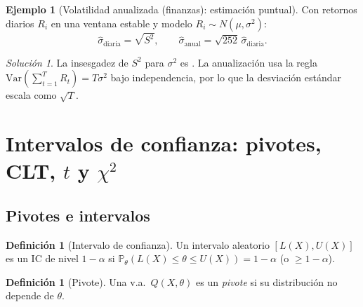 \documentclass[11pt]{article}
\theoremstyle{plain}
\theoremstyle{definition}
\newtheorem{definition}[theorem]{Definición}
\newtheorem{example}[theorem]{Ejemplo}
\theoremstyle{remark}
\theoremstyle{solstyle}
\newtheorem*{solution}{Solución}
\newcommand{\Var}{\mathrm{Var}}
\newcommand{\Pbb}{\mathbb{P}}
\newcommand{\1}{\mathbbm{1}}
\begin{document}
\begin{example}[Volatilidad anualizada (finanzas): estimación puntual]\label{ex:vol-annual}
Con retornos diarios $R_i$ en una ventana estable y modelo $R_i\sim N(\mu,\sigma^2)$:
\[
\widehat\sigma_{\text{diaria}}=\sqrt{S^2},\qquad
\widehat\sigma_{\text{anual}}=\sqrt{252}\,\widehat\sigma_{\text{diaria}}.
\]
\end{example}

\begin{solution}
La insesgadez de $S^2$ para $\sigma^2$ es .
La anualización usa la regla $\Var(\sum_{t=1}^{T}R_t)=T\sigma^2$ bajo independencia,
por lo que la desviación estándar escala como $\sqrt{T}$.
\end{solution}

\begin{center}
\end{center}

\section{Intervalos de confianza: pivotes, CLT, $t$ y $\chi^2$}

\subsection{Pivotes e intervalos}

\begin{definition}[Intervalo de confianza]
Un intervalo aleatorio $[L(X),U(X)]$ es un IC de nivel $1-\alpha$ si
$\Pbb_\theta(L(X)\le \theta\le U(X))=1-\alpha$ (o $\ge 1-\alpha$).
\end{definition}

\begin{definition}[Pivote]
Una v.a.\ $Q(X,\theta)$ es un \emph{pivote} si su distribución no depende de $\theta$.
\end{definition}
\end{document}
